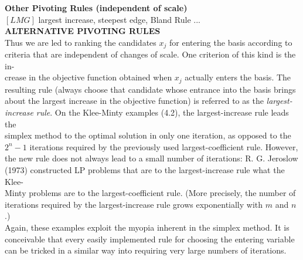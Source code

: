 \documentclass{article}%
\begin{document}
\textbf{Other Pivoting Rules (independent of scale)} \\
$[LMG]$ largest increase, steepest edge, Bland Rule ... \\
\textbf{ALTERNATIVE PIVOTING RULES} \\
Thus we are led to ranking the candidates $x_j$ for entering the basis according to \\
criteria that are independent of changes of scale. One criterion of this kind is the in- \\
crease in the objective function obtained when $x_j$ actually enters the basis. The \\
resulting rule (always choose that candidate whose entrance into the basis brings \\
about the largest increase in the objective function) is referred to as the \textit{largest-} \\
\textit{increase rule}. On the Klee-Minty examples (4.2), the largest-increase rule leads the \\
simplex method to the optimal solution in only one iteration, as opposed to the \\
$2^n - 1$ iterations required by the previously used largest-coefficient rule. However, \\
the new rule does not always lead to a small number of iterations: R. G. Jeroslow \\
(1973) constructed LP problems that are to the largest-increase rule what the Klee- \\
Minty problems are to the largest-coefficient rule. (More precisely, the number of \\
iterations required by the largest-increase rule grows exponentially with $m$ and $n$.) \\
Again, these examples exploit the myopia inherent in the simplex method. It is \\
conceivable that every easily implemented rule for choosing the entering variable \\
can be tricked in a similar way into requiring very large numbers of iterations.
%
\end{document}
